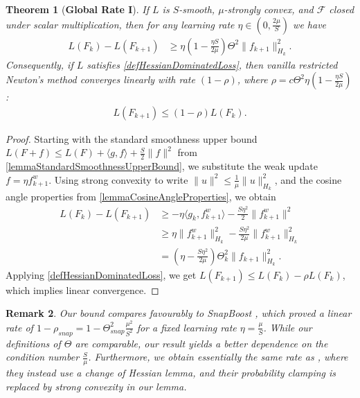 \documentclass{article}
\theoremstyle{plain}
\newtheorem{theorem}{Theorem}[section]
\newtheorem{remark}[theorem]{Remark} %
\theoremstyle{definition}
\theoremstyle{remark}
\begin{document}
\begin{theorem}[\textbf{Global Rate I}]\label{lemmaStandardSmoothnessResults}
    If $L$ is $S$-smooth, $\mu$-strongly convex, and $\mathcal{F}$ closed under scalar multiplication, then for any learning rate $\eta \in (0, \frac{2\mu}{S})$ we have
    \begin{align}
        L(F_k) - L(F_{k+1}) 
        &\geq \eta\left( 1 -\frac{\eta S}{2\mu}\right) \Theta^2\|f_{k+1}\|_{H_k}^2.
    \end{align}
    Consequently, if $L$ satisfies \cref{defHessianDominatedLoss}, then vanilla restricted Newton's method converges linearly with rate $(1-\rho)$, where $\rho = c\Theta^2 \eta(1 - \frac{\eta S}{2\mu})$:
    \begin{align}
        L(F_{k+1}) \leq (1-\rho) L(F_k).
    \end{align}
\end{theorem}
\begin{proof}
    Starting with the standard smoothness upper bound $L(F+f) \leq L(F) + \langle g, f \rangle + \frac{S}{2}\|f\|^2$ from \cref{lemmaStandardSmoothnessUpperBound}, we substitute the weak update $f = \eta f^w_{k+1}$. Using strong convexity to write $\|u\|^2 \leq \frac{1}{\mu}\|u\|_{H_k}^2$, and the cosine angle properties from \cref{lemmaCosineAngleProperties}, we obtain
    \begin{align}
        L(F_k) -L(F_{k+1})
        &\geq - \eta \langle g_k, f_{k+1}^w \rangle - \frac{S \eta^2}{2} \|f_{k+1}^w\|^2 \\
        &\geq \eta \|f_{k+1}^w\|_{H_k}^2 - \frac{S \eta^2}{2\mu} \|f_{k+1}^w\|_{H_k}^2 \\
        &= \left(\eta -\frac{S \eta^2}{2\mu} \right)\Theta_k^2\|f_{k+1}\|_{H_k}^2.
    \end{align}
    Applying \cref{defHessianDominatedLoss}, we get $L(F_{k+1}) \leq L(F_k) - \rho L(F_k)$, which implies linear convergence.
\end{proof}
\begin{remark}
    Our bound compares favourably to SnapBoost \cite{2020SnapBoostAHeterogeneousBoostingMachine}, which proved a linear rate of $1-\rho_{snap} = 1 - \Theta^2_{snap}\frac{\mu^2}{S^2}$ for a fixed learning rate $\eta = \frac{\mu}{S}$. While our definitions of $\Theta$ are comparable, our result yields a better dependence on the condition number $\frac{S}{\mu}$. Furthermore, we obtain essentially the same rate as \citet{2014AConvergenceRateAnalysisForLogitBoostMARTAndTheirVariant}, where they instead use a change of Hessian lemma, and their probability clamping is replaced by strong convexity in our lemma.
\end{remark}
\end{document}
